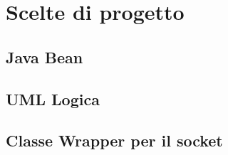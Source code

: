 \chapter{Scelte di progetto}
\section{Java Bean}\label{sec:java_bean}
\section{UML Logica}\label{sec:UML_logica}
\section{Classe Wrapper per il socket}\label{sec:wrap_sock}